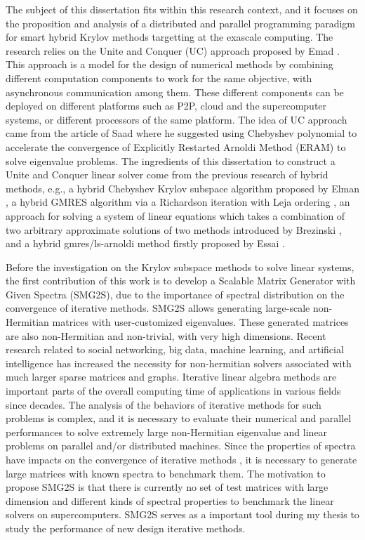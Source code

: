 The subject of this dissertation fits within this research context, and it focuses on the proposition and analysis of a distributed and parallel programming paradigm for smart hybrid Krylov methods targetting at the exascale computing. The research relies on the Unite and Conquer (UC) approach proposed by Emad \cite{emad2016unite}. This approach is a model for the design of numerical methods by combining different computation components to work for the same objective, with asynchronous communication among them. These different components can be deployed on different platforms such as P2P, cloud and the supercomputer systems, or different processors of the same platform. The idea of UC approach came from the article of Saad \cite{saad1984chebyshev} where he suggested using Chebyshev polynomial to accelerate the convergence of Explicitly Restarted Arnoldi Method (ERAM) to solve eigenvalue problems. The ingredients of this dissertation to construct a Unite and Conquer linear solver come from the previous research of hybrid methods, e.g., a hybrid Chebyshev Krylov subspace algorithm proposed by Elman \cite{elman1986hybrid}, a hybrid GMRES algorithm via a Richardson iteration with Leja ordering \cite{nachtigal1992hybrid}, an approach for solving a system of linear equations which takes a combination of two arbitrary approximate solutions of two methods introduced by Brezinski \cite{brezinski1994hybrid}, and a hybrid gmres/ls-arnoldi method firstly proposed by Essai \cite{essai1999heterogeneous}.

Before the investigation on the Krylov subspace methods to solve linear systems, the first contribution of this work is to develop a Scalable Matrix Generator with Given Spectra (SMG2S), due to the importance of spectral distribution on the convergence of iterative methods. SMG2S allows generating large-scale non-Hermitian matrices with user-customized eigenvalues. These generated matrices are also non-Hermitian and non-trivial, with very high dimensions. Recent research related to social networking, big data, machine learning, and artificial intelligence has increased the necessity for non-hermitian solvers associated with much larger sparse matrices and graphs. Iterative linear algebra methods are important parts of the overall computing time of applications in various fields since decades. The analysis of the behaviors of iterative methods for such problems is complex, and it is necessary to evaluate their numerical and parallel performances to solve extremely large non-Hermitian eigenvalue and linear problems on parallel and/or distributed machines. Since the properties of spectra have impacts on the convergence of iterative methods , it is necessary to generate large matrices with known spectra to benchmark them. The motivation to propose SMG2S is that there is currently no set of test matrices with large dimension and different kinds of spectral properties to benchmark the linear solvers on supercomputers. SMG2S serves as a important tool during my thesis to study the performance of new design iterative methods.

